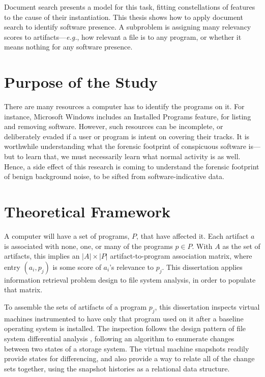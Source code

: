 \documentclass[11pt]{ucthesis}
\theoremstyle{plain}
\theoremstyle{definition}
\newcommand{\eg}{\emph{e.g.}\xspace}
\begin{document}
Document search presents a model for this task, fitting constellations of features to the cause of their instantiation.  This thesis shows how to apply document search to identify software presence.  A subproblem is assigning many relevancy scores to artifacts---\eg, how relevant a file is to any program, or whether it means nothing for any software presence.


\section{Purpose of the Study}

There are many resources a computer has to identify the programs on it.  For instance, Microsoft Windows includes an Installed Programs feature, for listing and removing software.  However, such resources can be incomplete, or deliberately evaded if a user or program is intent on covering their tracks.  It is worthwhile understanding what the forensic footprint of conspicuous software is---but to learn that, we must necessarily learn what normal activity is as well.  Hence, a side effect of this research is coming to understand the forensic footprint of benign background noise, to be sifted from software-indicative data.


\section{Theoretical Framework}

A computer will have a set of programs, $P$, that have affected it.  Each artifact $a$ is associated with none, one, or many of the programs $p \in P$.  With $A$ as the set of artifacts, this implies an $|A| \times |P|$ artifact-to-program association matrix, where entry $(a_i, p_j)$ is some score of $a_i$'s relevance to $p_j$.  This dissertation applies information retrieval problem design to file system analysis, in order to populate that matrix.

To assemble the sets of artifacts of a program $p_j$, this dissertation inspects virtual machines instrumented to have only that program used on it after a baseline operating system is installed.  The inspection follows the design pattern of file system differential analysis \cite{garfinkel:dfrws12a}, following an algorithm to enumerate changes between two states of a storage system.  The virtual machine snapshots readily provide states for differencing, and also provide a way to relate all of the change sets together, using the snapshot histories as a relational data structure.
\end{document}

